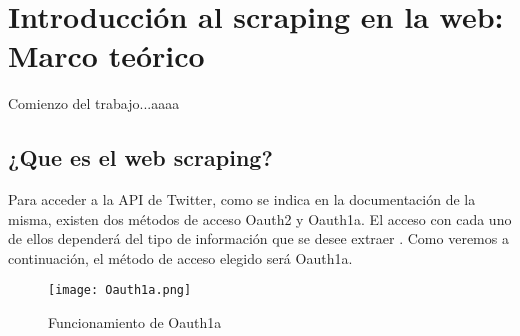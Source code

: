 
\chapter{Introducción al scraping en la web: Marco teórico}
\label{cha:introduccion al scraping en la web}

Comienzo del trabajo...aaaa

\section{¿Que es el web scraping?}
\label{sec:Que es el web scraping}


Para acceder a la API de Twitter, como se indica en la documentación de la misma, existen dos métodos de 
acceso Oauth2 y Oauth1a. El acceso con cada uno de ellos dependerá del tipo de información que se desee 
extraer \cite{oauth1a}. Como veremos a continuación, el método de acceso elegido será Oauth1a.

\begin{figure}[tphb]
  		   \centering
     		   \texttt{[image: Oauth1a.png]}
  		   \caption{Funcionamiento de Oauth1a}
  		   \label{img:oauth1a}
\end{figure}






